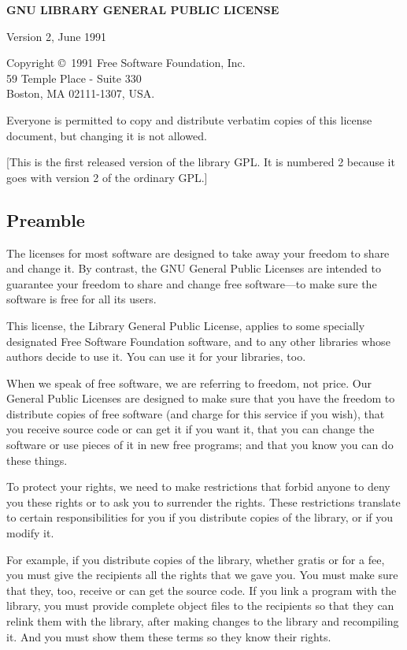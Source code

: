 \centerline{\textbf{GNU LIBRARY GENERAL PUBLIC LICENSE}}
\centerline{Version 2, June 1991}

Copyright \copyright\ 1991 Free Software Foundation, Inc.\\
59 Temple Place - Suite 330\\
Boston, MA 02111-1307, USA.

Everyone is permitted to copy and distribute verbatim copies
of this license document, but changing it is not allowed.

[This is the first released version of the library GPL\@.  It is
 numbered 2 because it goes with version 2 of the ordinary GPL.]

\subsection*{Preamble}

  The licenses for most software are designed to take away your
freedom to share and change it.  By contrast, the GNU General Public
Licenses are intended to guarantee your freedom to share and change
free software---to make sure the software is free for all its users.

  This license, the Library General Public License, applies to some
specially designated Free Software Foundation software, and to any
other libraries whose authors decide to use it.  You can use it for
your libraries, too.

  When we speak of free software, we are referring to freedom, not
price.  Our General Public Licenses are designed to make sure that you
have the freedom to distribute copies of free software (and charge for
this service if you wish), that you receive source code or can get it
if you want it, that you can change the software or use pieces of it
in new free programs; and that you know you can do these things.

  To protect your rights, we need to make restrictions that forbid
anyone to deny you these rights or to ask you to surrender the rights.
These restrictions translate to certain responsibilities for you if
you distribute copies of the library, or if you modify it.

  For example, if you distribute copies of the library, whether gratis
or for a fee, you must give the recipients all the rights that we gave
you.  You must make sure that they, too, receive or can get the source
code.  If you link a program with the library, you must provide
complete object files to the recipients so that they can relink them
with the library, after making changes to the library and recompiling
it.  And you must show them these terms so they know their rights.

